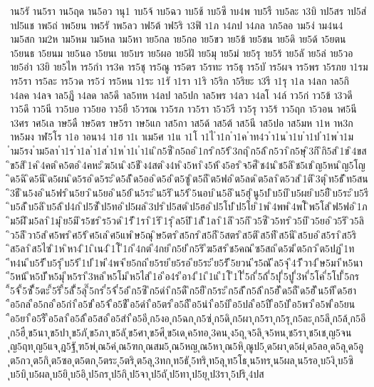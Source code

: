 {าน5รั
าน5รา
าน5ฤด
าน5อว
านุ1
าบ5จ้
าบ5ฉว
าบ5ช้
าบ5ซึ
าบ4พ
าบ5รื
าบ5ละ
า3บิ
าป5สร
าป5ส่
าป5แช
าพ5ถ่
าพ5ยน
าพ5รั
าพ5ลว
าฟ5ต้
าฟ5ริ
า3ฟิ
า1ภ
า4ภป
า4ภล
าภ5ลอ
าม5ง่
าม4น4
าม5สก
าม2ห
าม5หม
าม5หล
าม5หา
าย5กล
าย5กอ
าย5ขว
าย5ข้
าย5ชน
าย5ดิ
าย5ด้
า5ยตน
า5ยนธ
า5ยนม
าย5นอ
า5ยนเ
าย5บร
าย5ผอ
าย5ฝั
าย5มุ
าย5ม่
าย5รุ
าย5ร้
าย5ลั
าย5ล่
าย5วอ
าย5อำ
า3ยิ
าย5ไห
าร5กำ
าร3ค
าร5ชุ
าร5ณู
าร5ตร
า5รทะ
าร5ธุ
าร5บั
าร5ผจ
าร5พร
า5รภย
า1รม
าร5รา
าร5ละ
าร5วด
าร5ว่
าร5หน
า1ระ
า1รั
า1รา
า1ริ
า5ริก
า5ริยะ
า3รี
า1รุ
า1ล
า4ลก
าล5กิ
า4ลค
า4ลจ
าล5ฎี
า4ลด
าล5ดี
าล5ทห
า4ลป
าล5ปก
าล5พร
า4ลว
า4ลโ
า4ล์
าว5ก่
าว5ข้
า3วดี
าว5ดึ
าว5นี
าว5บอ
าว5ยอ
าว5ยื
า5วรณ
าว5รภ
าว5รา
า5ว5รี
าว5รุ
าว5ร้
าว5ฤก
า5วอน
าศ5นี
า3ศร
าศ5เล
าษ5ดื
าษ5ตร
าษ5รา
าษ5แก
าส5กา
าส5ด้
าส5ต้
าส5นี
าส5ปอ
าส5มห
า1ห
าห3ก
าห5มง
าฬ5โร
า1อ
าอนา4
า1ฮ
า1เ
าเม5ศ
า1แ
า1โ
า1ไ
ำ1ก
ำ1ค
ำท4ว
ำ1น
ำ1บ
ำ1ป
ำ1พ
ำ1ม
ำม5รง
ำม5ลา
ำ1ร
ำ1ล
ำ1ส
ำ1ห
ำ1เ
ำ1แ
ิก5ซี
ิก5ถอ
ิ1กร
ิก5ร้
ิ3กฤ
ิก5ล้
ิก5วา
ิก5ษุ
ิ3กิ
ิกิ5ส
ิ1ข
ิ4ขส
ิข5สิ
ิ1ค
ิ4คต
ิค5ตอ
ิ4คหะ
ิฆ5เน
ิง5ชี
ิง4สต
ิง4ห
ิง5หา
ิง5ห้
ิง5อร
ิจ5ศี
ิช4น
ิช5ลิ
ิช5เช
ิญ5หน
ิญ5โญ
ิด5ฉิ
ิด5นี
ิด5ผน
ิด5รอ
ิด5ระ
ิด5ลั
ิด5ออ
ิด5อ่
ิต5ซู
ิต5ถี
ิต5ฟอ
ิต5ลด
ิต5ลา
ิต5วส
ิ1ติ
ิ3ตุ
ิท5ธั
ิท5สน
ิ3ธี
ิน5งอ
ิน5ฟร
ิน5ยว
ิน5ยอ
ิน5ย้
ิน5ระ
ิน5ริ
ิน5ร้
ิ5นอบ
ิน5อิ
ิน5ฮุ
ินู5ป
ิบ5บิ
ิบ5ผย
ิบ5ยื
ิบ5ระ
ิบ5รี
ิบ5ลั
ิบ5ลิ
ิบ5ล้
ิป4ก
ิป5ซั
ิป5ทอ
ิป5ผล
ิ3ปร
ิป5สต
ิป5ฮอ
ิป5โป
ิป5โย
ิ1พ
ิ4พพ
ิ4พโ
ิพ5โส
ิฟ5ฟอ
ิ1ภ
ิม5ฝี
ิม5ลา
ิ1มุ
ิย5มิ
ิร5ชร
ิร5วด
ิ1รั
ิ1รา
ิ1ริ
ิ1รุ
ิล5ปิ
ิ1ลั
ิ1ลา
ิ1ลิ
ิว5กิ
ิว5ซี
ิว5ทร
ิว5บิ
ิว5ยอ
ิว5ริ
ิว5ลิ
ิว5ลึ
ิวา5ส
ิศ5พร
ิศ5ร้
ิศ5เล
ิศ5แพ
ิษ5ณุ
ิษ5ตร
ิส5กร
ิส5กี
ิ5สตร
ิส5ติ
ิส5ที
ิส5นี
ิส5บอ
ิส5รา
ิส5ริ
ิส5ลา
ิส5ไซ
ิ1ห
ิหา4
ิ1เ
ิเน4
ิ1โ
ี1ก
ี4กต
ี4กย
ีก5ย่
ีก5ริ
ีฆ5สร
ีช5คณ
ีซ5สถ
ีด5ฆ่
ีต5กว
ีต5ปฏ
ี1ท
ีท4น
ีบ5รั
ีบ5รุ
ีบ5ร้
ี1ป
ี1พ
ี4พจ
ีย5กถ
ีย5รย
ีย5รอ
ีย5ระ
ีย5รั
ี5ยวน
ีร5ณั
ีล5จุ
ี4วั
ีวา4
ีษ5มา
ีห5นา
ี5หน้
ีห5บั
ีห5มุ
ีห5รา
ี3หล
ีห5โม
ีห5ไส
ี1อ
ีอ4ร
ีอา4
ี1เ
ี1แ
ี1โ
ี1ไ
ี่5ก่
ี่5ถ้
ี่5ปุ
ี่5ปู
ี่3ห
ี่5โค
ี่5โป
ี้5กร
ี้5จ้
ี้5ซั
ี้5ตะ
ี้5ริ
ี้5ลั
ี้5ลุ
ี๊5กร
ี๋5จ้
ี๋5อ๋
ึก5ซึ
ึก5ดำ
ึก5ดื
ึก5ยื
ึก5ระ
ึก5ลั
ึก5ล้
ึก5ฮั
ึด5ถื
ึด5ฮั
ึน5ทึ
ืด5ฮา
ือ5กล
ือ5กอ
ือ5กำ
ือ5ข่
ือ5จ้
ือ5ชื
ือ5ดำ
ือ5ตร
ือ5ถื
ือ5นำ
ือ5บิ
ือ5ปล
ือ5ปื
ือ5ป่
ือ5พว
ือ5พ่
ือ5ยน
ือ5ยา
ือ5รื
ือ5ลา
ือ5ล้
ือ5สอ
ือ5สำ
ือ5อี
ุก5งอ
ุก5ฉก
ุก5ซ่
ุก5ดิ
ุก5ผา
ุก5รา
ุก5รุ
ุก5ละ
ุก5ลี
ุก5ล้
ุก5อี
ุก5ฮื
ุข5นา
ุข5ปา
ุข5ภั
ุข5ภา
ุข5ลั
ุข5ศา
ุข5ศึ
ุข5เด
ุค5ทอ
ุ3คน
ุง5ถุ
ุจ5ลิ
ุจ5หน
ุช5รา
ุช5เช
ุญ5จน
ุญ5ฤท
ุญ5แจ
ุฎ5ฐั
ุฑ5พ่
ุณ5ค่
ุณ5ฑก
ุณสม5
ุณ5หญ
ุณ5หา
ุณ5หิ
ุณูป5
ุด5ผา
ุด5ผ่
ุด5ลอ
ุด5ลุ
ุด5อู
ุต5กว
ุต5กิ
ุต5ซอ
ุต5ตก
ุ5ตระ
ุ5ตริ
ุต5ลุ
ุ3ทก
ุท5ธั
ุ5ทริ
ุท5ลุ
ุท5โธ
ุน5ทร
ุน5ผล
ุน5รอ
ุบ5งิ
ุบ5ซิ
ุบ5บิ
ุบ5ผล
ุบ5ยิ
ุบ5อิ
ุป5กร
ุป5กิ
ุป5จา
ุป5ถั
ุป5ทา
ุป5ยุ
ุป3รา
ุ5ปริ
ุ4ปส
}
